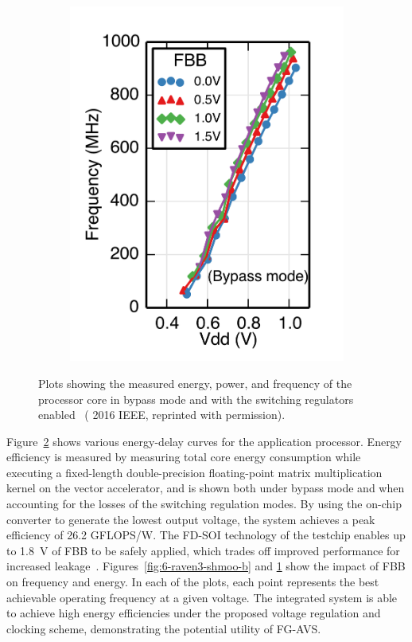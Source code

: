 \documentclass[graybox]{svmult}
\begin{document}
\begin{figure}
\begin{subfigure}[t]{0.23\textwidth}
  \includegraphics[width=\textwidth]{6-raven3-shmoo-d}
  \caption{}
  \label{fig:6-raven3-shmoo-d}
  \end{subfigure}
  \hspace*{\fill}
  \caption{Plots showing the measured energy, power, and frequency of the processor core in bypass mode and with the switching regulators enabled~\cite{Zimmer2016} ({\textcopyright} 2016 IEEE, reprinted with permission).}
  \label{fig:6-raven3-shmoo}
\end{figure}

Figure~\ref{fig:6-raven3-shmoo} shows various energy-delay curves for the application processor.
Energy efficiency is measured by measuring total core energy consumption while executing a fixed-length double-precision floating-point matrix multiplication kernel on the vector accelerator, and is shown both under bypass mode and when accounting for the losses of the switching regulation modes.
By using the on-chip converter to generate the lowest output voltage, the system achieves a peak efficiency of 26.2 GFLOPS/W.
The FD-SOI technology of the testchip enables up to \SI{1.8}{\volt} of FBB to be safely applied, which trades off improved performance for increased leakage~\cite{Jacquet2014}.
Figures~\ref{fig:6-raven3-shmoo-b} and \ref{fig:6-raven3-shmoo-d} show the impact of FBB on frequency and energy.
In each of the plots, each point represents the best achievable operating frequency at a given voltage.
The integrated system is able to achieve high energy efficiencies under the proposed voltage regulation and clocking scheme, demonstrating the potential utility of FG-AVS.
\end{document}
